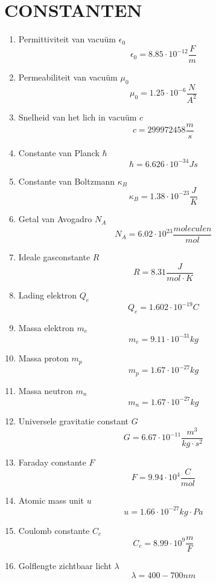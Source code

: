 \documentclass[12pt]{article}
\begin{document}
    \maketitle

    \section{CONSTANTEN}
    \begin{enumerate}
        \item Permittiviteit van vacuüm $\epsilon_0$ $$\epsilon_0 = 8.85 \cdot 10^{-12} \frac{F}{m}$$
        \item Permeabiliteit van vacuüm $\mu_0$ $$\mu_0 = 1.25 \cdot 10^{-6} \frac{N}{A^2}$$
        \item Snelheid van het lich in vacuüm $c$ $$c = 299 972 458 \frac{m}{s}$$
        \item Constante van Planck $\hbar$ $$\hbar = 6.626  \cdot 10^{-34} Js$$
        \item Constante van Boltzmann $\kappa_B$ $$\kappa_B = 1.38 \cdot 10^{-23} \frac{J}{K}$$
        \item Getal van Avogadro $N_A$ $$N_A = 6.02 \cdot 10^{23} \frac{moleculen}{mol}$$
        \item Ideale gasconstante $R$ $$R= 8.31 \frac{J}{mol \cdot K}$$
        \item Lading elektron $Q_e$ $$Q_e = 1.602 \cdot 10^{-19} C$$
        \item Massa elektron $m_e$ $$m_e = 9.11 \cdot 10^{-31} kg$$
        \item Massa proton $m_p$ $$m_p = 1.67 \cdot 10^{-27} kg$$
        \item Massa neutron $m_n$ $$m_n = 1.67 \cdot 10^{-27} kg$$
        \item Universele gravitatie constant $G$ $$G=6.67 \cdot 10^{-11} \frac{m^3}{kg \cdot s^2}$$
        \item Faraday constante $F$ $$F=9.94 \cdot 10^{4} \frac{C}{mol}$$
        \item Atomic mass unit $u$ $$u= 1.66 \cdot 10^{-27}kg \cdot Pa$$
        \item Coulomb constante $C_c$ $$C_c = 8.99 \cdot 10^{9} \frac{m}{F}$$
        \item Golflengte zichtbaar licht $\lambda$ $$\lambda = 400 - 700 nm$$
    \end{enumerate}
\end{document}
